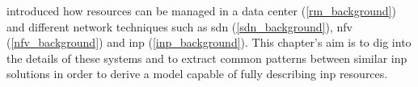  introduced how resources can be managed in a data center (\autoref{rm_background}) and different network techniques such as \gls{sdn} (\autoref{sdn_background}), \gls{nfv} (\autoref{nfv_background}) and \gls{inp} (\autoref{inp_background}).
This chapter's aim is to dig into the details of these systems and to extract common patterns between similar \gls{inp} solutions in order to derive a model capable of fully describing \gls{inp} resources.
